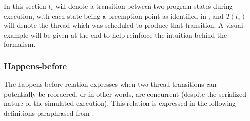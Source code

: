 In this section $t_i$ will denote a transition between two program states during execution,
with each state being a preemption point as identified in \sect{\ref{sec:landslide-pps}},
and $T(t_i)$ will denote the thread which was scheduled to produce that transition.
A visual example will be given at the end to help reinforce the intuition behind the formalism.

\subsubsection{Happens-before}
\label{sec:landslide-dpor-hb}

The happens-before relation expresses when two thread transitions can potentially be reordered,
or in other words, are concurrent (despite the serialized nature of the simulated execution).
This relation is expressed in the following definitions paraphrased from \cite{dpor}.

